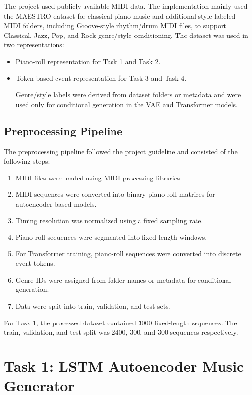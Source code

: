 \documentclass[conference]{IEEEtran}
\begin{document}
The project used publicly available MIDI data. The implementation mainly used the MAESTRO dataset for classical piano music and additional style-labeled MIDI folders, including Groove-style rhythm/drum MIDI files, to support Classical, Jazz, Pop, and Rock genre/style conditioning. The dataset was used in two representations:

\begin{itemize}
    \item Piano-roll representation for Task 1 and Task 2.
    \item Token-based event representation for Task 3 and Task 4.
    
Genre/style labels were derived from dataset folders or metadata and were used only for conditional generation in the VAE and Transformer models.
\end{itemize}

\subsection{Preprocessing Pipeline}

The preprocessing pipeline followed the project guideline and consisted of the following steps:

\begin{enumerate}
    \item MIDI files were loaded using MIDI processing libraries.
    \item MIDI sequences were converted into binary piano-roll matrices for autoencoder-based models.
    \item Timing resolution was normalized using a fixed sampling rate.
    \item Piano-roll sequences were segmented into fixed-length windows.
    \item For Transformer training, piano-roll sequences were converted into discrete event tokens.
    \item Genre IDs were assigned from folder names or metadata for conditional generation.
    \item Data were split into train, validation, and test sets.
\end{enumerate}

For Task 1, the processed dataset contained 3000 fixed-length sequences. The train, validation, and test split was 2400, 300, and 300 sequences respectively.

\section{Task 1: LSTM Autoencoder Music Generator}
\end{document}
